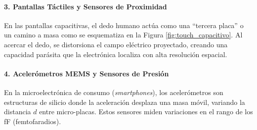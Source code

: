 
\paragraph{3. Pantallas Táctiles y Sensores de Proximidad}
En las pantallas capacitivas, el dedo humano actúa como una ``tercera placa'' o un camino a masa como se esquematiza en la Figura \ref{fig:touch_capacitivo}. Al acercar el dedo, se distorsiona el campo eléctrico proyectado, creando una capacidad parásita que la electrónica localiza con alta resolución espacial.

\begin{marginfigure}
    \centering
    \shorthandoff{>}
    \caption[Principio del touchscreen capacitivo.]{Principio del \textit{touchscreen} capacitivo. El cuerpo humano altera el campo eléctrico proyectado por la matriz de electrodos.}\label{fig:touch_capacitivo}
\end{marginfigure}

\paragraph{4. Acelerómetros MEMS y Sensores de Presión}
En la microelectrónica de consumo (\textit{smartphones}), los acelerómetros son estructuras de silicio donde la aceleración desplaza una masa móvil, variando la distancia $d$ entre micro-placas. Estos sensores miden variaciones en el rango de los \unit{fF} (femtofaradios).

